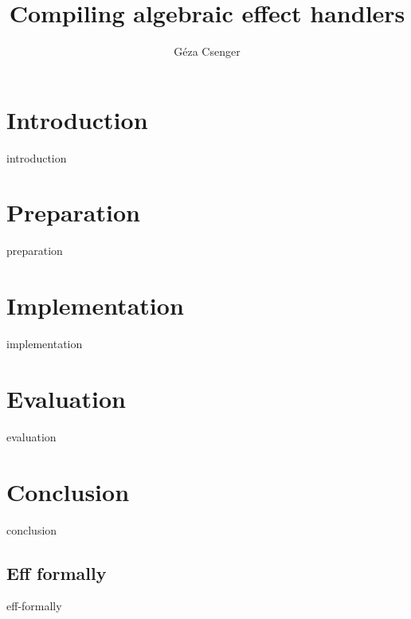 \documentclass[oneside]{book}
\title{Compiling algebraic effect handlers}
\author{Géza Csenger}
\date{}
\begin{document}
\maketitle
\tableofcontents

\chapter{Introduction}
{introduction}

\chapter{Preparation}
{preparation}

\chapter{Implementation}
{implementation}

\chapter{Evaluation}
{evaluation}

\chapter{Conclusion}
{conclusion}

\begin{appendices}
    \chapter{Eff formally}
    {eff-formally}
\end{appendices}

{}

\end{document}
